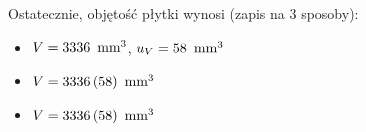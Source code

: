 \documentclass[a4paper]{article}
\begin{document}
Ostatecznie, objętość płytki wynosi (zapis na 3 sposoby):

\begin{itemize}
\item $V = 3336 \enskip \text{mm}^3$, $u_V = 58 \enskip \text{mm}^3$
\item $V = 3336 \, (58) \enskip \text{mm}^3$
\item $V = 3336 \, (58) \enskip \text{mm}^3$
\end{itemize}
\end{document}
